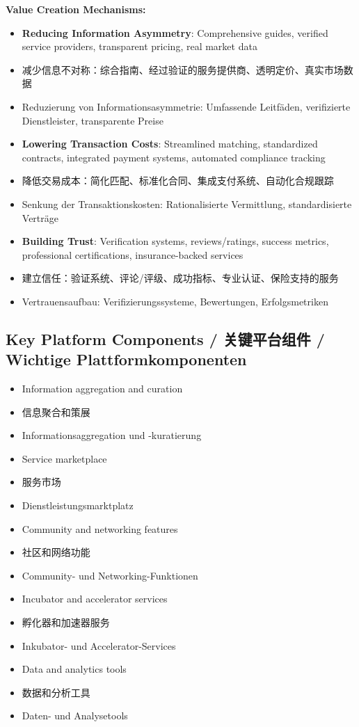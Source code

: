 \textbf{Value Creation Mechanisms:}
\begin{itemize}
    \item \textbf{Reducing Information Asymmetry}: Comprehensive guides, verified service providers, transparent pricing, real market data
    \item 减少信息不对称：综合指南、经过验证的服务提供商、透明定价、真实市场数据
    \item Reduzierung von Informationsasymmetrie: Umfassende Leitfäden, verifizierte Dienstleister, transparente Preise
    
    \item \textbf{Lowering Transaction Costs}: Streamlined matching, standardized contracts, integrated payment systems, automated compliance tracking
    \item 降低交易成本：简化匹配、标准化合同、集成支付系统、自动化合规跟踪
    \item Senkung der Transaktionskosten: Rationalisierte Vermittlung, standardisierte Verträge
    
    \item \textbf{Building Trust}: Verification systems, reviews/ratings, success metrics, professional certifications, insurance-backed services
    \item 建立信任：验证系统、评论/评级、成功指标、专业认证、保险支持的服务
    \item Vertrauensaufbau: Verifizierungssysteme, Bewertungen, Erfolgsmetriken
\end{itemize}

\subsection{Key Platform Components / 关键平台组件 / Wichtige Plattformkomponenten}
\begin{itemize}
    \item Information aggregation and curation
    \item 信息聚合和策展
    \item Informationsaggregation und -kuratierung
    \item Service marketplace
    \item 服务市场
    \item Dienstleistungsmarktplatz
    \item Community and networking features
    \item 社区和网络功能
    \item Community- und Networking-Funktionen
    \item Incubator and accelerator services
    \item 孵化器和加速器服务
    \item Inkubator- und Accelerator-Services
    \item Data and analytics tools
    \item 数据和分析工具
    \item Daten- und Analysetools
\end{itemize}

